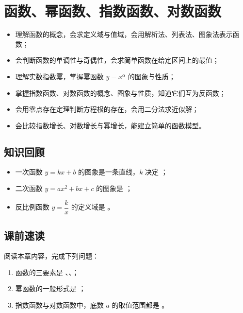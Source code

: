 \section{函数、幂函数、指数函数、对数函数}

\begin{learnobjective}
\begin{itemize}
  \item 理解函数的概念，会求定义域与值域，会用解析法、列表法、图象法表示函数；
  \item 会判断函数的单调性与奇偶性，会求简单函数在给定区间上的最值；
  \item 理解实数指数幂，掌握幂函数 $y=x^{\alpha}$ 的图象与性质；
  \item 掌握指数函数、对数函数的概念、图象与性质，知道它们互为反函数；
  \item 会用零点存在定理判断方程根的存在，会用二分法求近似解；
  \item 会比较指数增长、对数增长与幂增长，能建立简单的函数模型。
\end{itemize}
\end{learnobjective}

\begin{preview}
\subsection*{知识回顾}
\begin{itemize}
  \item 一次函数 $y=kx+b$ 的图象是一条直线，$k$ 决定 \blank；
  \item 二次函数 $y=ax^2+bx+c$ 的图象是 \blank；
  \item 反比例函数 $y=\dfrac{k}{x}$ 的定义域是 \blank。
\end{itemize}

\subsection*{课前速读}
阅读本章内容，完成下列问题：
\begin{enumerate}
  \item 函数的三要素是 \blank、\blank、\blank；
  \item 幂函数的一般形式是 \blank；
  \item 指数函数与对数函数中，底数 $a$ 的取值范围都是 \blank。
\end{enumerate}
\end{preview}

